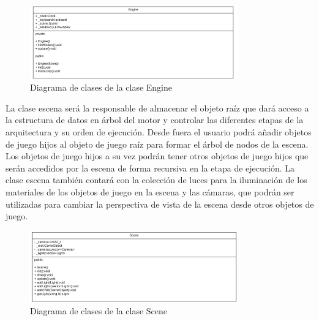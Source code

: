 \documentclass[a4paper]{book}
\begin{document}
\begin{figure}[H]
    \centering
    \includegraphics[width=9cm, keepaspectratio]{img/Engine.png}
    \caption{Diagrama de clases de la clase Engine}
    \label{Engine}
\end{figure}

La clase escena será la responsable de almacenar el objeto raíz que dará acceso a la estructura de datos en árbol del motor y
controlar las diferentes etapas de la arquitectura y su orden de ejecución. Desde fuera el usuario podrá añadir objetos de
juego hijos al objeto de juego raíz para formar el árbol de nodos de la escena. Los objetos de juego hijos a su vez podrán
tener otros objetos de juego hijos que serán accedidos por la escena de forma recursiva en la etapa de ejecución. La clase escena también
contará con la colección de luces para la iluminación de los materiales de los objetos de juego en la escena y las cámaras, que podrán
ser utilizadas para cambiar la perspectiva de vista de la escena desde otros objetos de juego.

\begin{figure}[H]
    \centering
    \includegraphics[width=9cm, keepaspectratio]{img/Scene.png}
    \caption{Diagrama de clases de la clase Scene}
    \label{Scene}
\end{figure}
\end{document}
